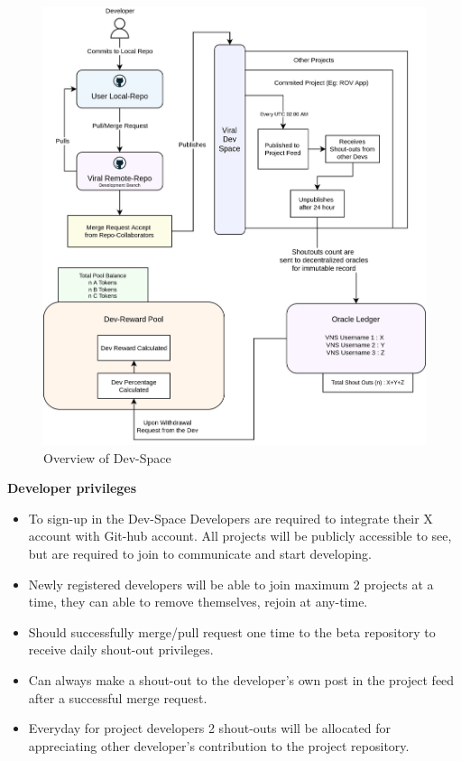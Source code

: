 \documentclass[letterpaper,11pt]{article}
\begin{document}
\begin{figure}
\begin{center}
\includegraphics[width=13cm]{devspace-overview}
\caption{Overview of Dev-Space}
\end{center}
\end{figure}

\textbf{Developer privileges}

\begin{itemize}[wide, labelwidth=!, labelindent=0pt]
\item To sign-up in the Dev-Space Developers are required to integrate their X account with Git-hub account. All projects will be publicly accessible to see, but are required to join to communicate and start developing.
\item Newly registered developers will be able to join maximum 2 projects at a time, they can able to remove themselves, rejoin at any-time.
\item Should successfully merge/pull request one time to the beta repository to receive daily shout-out privileges.
\item Can always make a shout-out to the developer's own post in the project feed after a successful merge request.
\item Everyday for project developers 2 shout-outs will be allocated for appreciating other developer's contribution to the project repository.
\end{itemize}
\end{document}
